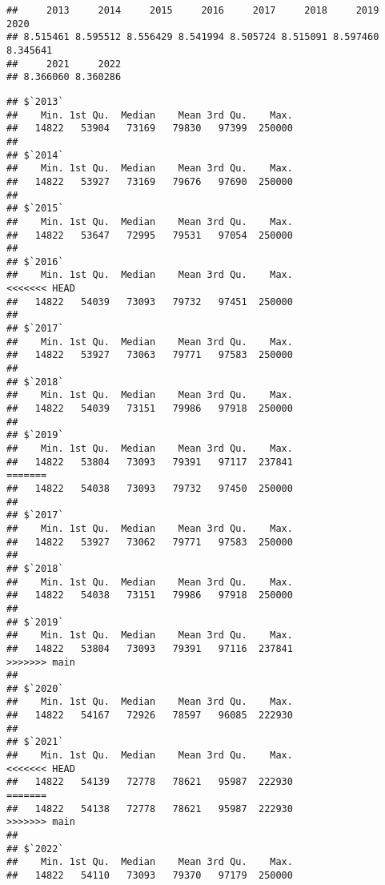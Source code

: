 \documentclass[
]{article}
\newenvironment{Shaded}{\begin{snugshade}}{\end{snugshade}}
\newcommand{\AttributeTok}[1]{\textcolor[rgb]{0.13,0.29,0.53}{#1}}
\newcommand{\ConstantTok}[1]{\textcolor[rgb]{0.56,0.35,0.01}{#1}}
\newcommand{\FunctionTok}[1]{\textcolor[rgb]{0.13,0.29,0.53}{\textbf{#1}}}
\newcommand{\NormalTok}[1]{#1}
\newcommand{\SpecialCharTok}[1]{\textcolor[rgb]{0.81,0.36,0.00}{\textbf{#1}}}
\begin{document}
\begin{Shaded}
\end{Shaded}

\begin{verbatim}
##     2013     2014     2015     2016     2017     2018     2019     2020 
## 8.515461 8.595512 8.556429 8.541994 8.505724 8.515091 8.597460 8.345641 
##     2021     2022 
## 8.366060 8.360286
\end{verbatim}

\begin{Shaded}
\end{Shaded}

\begin{verbatim}
## $`2013`
##    Min. 1st Qu.  Median    Mean 3rd Qu.    Max. 
##   14822   53904   73169   79830   97399  250000 
## 
## $`2014`
##    Min. 1st Qu.  Median    Mean 3rd Qu.    Max. 
##   14822   53927   73169   79676   97690  250000 
## 
## $`2015`
##    Min. 1st Qu.  Median    Mean 3rd Qu.    Max. 
##   14822   53647   72995   79531   97054  250000 
## 
## $`2016`
##    Min. 1st Qu.  Median    Mean 3rd Qu.    Max. 
<<<<<<< HEAD
##   14822   54039   73093   79732   97451  250000 
## 
## $`2017`
##    Min. 1st Qu.  Median    Mean 3rd Qu.    Max. 
##   14822   53927   73063   79771   97583  250000 
## 
## $`2018`
##    Min. 1st Qu.  Median    Mean 3rd Qu.    Max. 
##   14822   54039   73151   79986   97918  250000 
## 
## $`2019`
##    Min. 1st Qu.  Median    Mean 3rd Qu.    Max. 
##   14822   53804   73093   79391   97117  237841 
=======
##   14822   54038   73093   79732   97450  250000 
## 
## $`2017`
##    Min. 1st Qu.  Median    Mean 3rd Qu.    Max. 
##   14822   53927   73062   79771   97583  250000 
## 
## $`2018`
##    Min. 1st Qu.  Median    Mean 3rd Qu.    Max. 
##   14822   54038   73151   79986   97918  250000 
## 
## $`2019`
##    Min. 1st Qu.  Median    Mean 3rd Qu.    Max. 
##   14822   53804   73093   79391   97116  237841 
>>>>>>> main
## 
## $`2020`
##    Min. 1st Qu.  Median    Mean 3rd Qu.    Max. 
##   14822   54167   72926   78597   96085  222930 
## 
## $`2021`
##    Min. 1st Qu.  Median    Mean 3rd Qu.    Max. 
<<<<<<< HEAD
##   14822   54139   72778   78621   95987  222930 
=======
##   14822   54138   72778   78621   95987  222930 
>>>>>>> main
## 
## $`2022`
##    Min. 1st Qu.  Median    Mean 3rd Qu.    Max. 
##   14822   54110   73093   79370   97179  250000
\end{verbatim}
\end{document}
